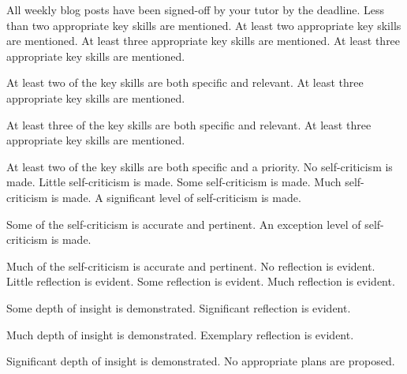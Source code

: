 \documentclass{../fal_assignment}
\begin{document}
\begin{markingrubric}
%
        \grade 		All weekly blog posts have been signed-off by your tutor by the deadline.
%
        \grade\fail 	Less than two appropriate key skills are mentioned.
        \grade 		At least two appropriate key skills are mentioned.
        \grade 		At least three appropriate key skills are mentioned.
        \grade 		At least three appropriate key skills are mentioned.
        \par 		At least two of the key skills are both specific and relevant.
        \grade 		At least three appropriate key skills are mentioned.
        \par 		At least three of the key skills are both specific and relevant.
        \grade 		At least three appropriate key skills are mentioned.
        \par 		At least two of the key skills are both specific and a priority.
%
        \grade\fail 	No self-criticism is made.
        \grade 		Little self-criticism is made.
        \grade 		Some self-criticism is made.
        \grade 		Much self-criticism is made.
        \grade 		A significant level of self-criticism is made.
            \par 		Some of the self-criticism is accurate and pertinent.
        \grade 		An exception level of self-criticism is made.
            \par 		Much of the self-criticism is accurate and pertinent.
%
        \grade\fail 	No reflection is evident.
        \grade 		Little reflection is evident.
        \grade 		Some reflection is evident.
        \grade 		Much reflection is evident.
        \par 		Some depth of insight is demonstrated.
        \grade 		Significant reflection is evident.
        \par 		Much depth of insight is demonstrated.
        \grade 		Exemplary reflection is evident.
        \par 		Significant depth of insight is demonstrated.
%
        \grade\fail 	No appropriate plans are proposed.

\end{markingrubric}
\end{document}
